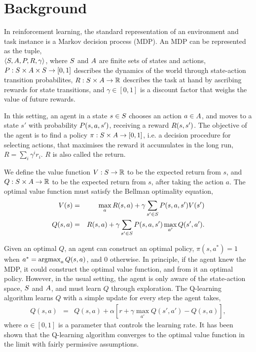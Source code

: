 \section{Background}
\label{sec:background}

In reinforcement learning, the standard representation of an environment
and task instance is a Markov decision process (MDP). An MDP can be
represented as the tuple, \\ $\langle  S, A, P,
R, \gamma  \rangle$, where $S$ and $A$ are finite sets of
states and actions, $P: S \times A \times
S \to [0,1]$ describes the dynamics of the world through
state-action transition probabilites, $R: S \times A
\to \mathbb{R}$ describes the task at hand by ascribing rewards for state
transitions, and $\gamma \in [0,1]$ is a discount factor that weighs the
value of future rewards.

In this setting, an agent in a state $s \in S$ chooses an action
$a \in A$, and moves to a state $s'$ with probability
$P(s,a,s')$, receiving a reward $R(s,s')$. The
objective of the agent is to find a policy $\pi: S \times A
\to [0,1]$, i.e. a decision procedure for selecting actions, that
maximises the reward it accumulates in the long run, $R = \sum_{i}
\gamma^i r_i$. $R$ is also called the return.

We define the value function $V: S \to \mathbb{R}$ to be the expected
return from $s$, and $Q: S \times A \to \mathbb{R}$ to be the
expected return from $s$, after taking the action $a$. The optimal value
function must satisfy the Bellman optimality equation, 
\begin{eqnarray*}
  V(s) &=& \max_{a} R(s,a) + \gamma \sum_{s' \in S} P(s,a,s') V(s') \\
  Q(s,a) &=& R(s,a) + \gamma \sum_{s' \in S} P(s,a,s') \max_{a'} Q(s',a').
\end{eqnarray*}

Given an optimal $Q$, an agent can construct an optimal policy,
$\pi(s,a^*) = 1$ when $a^* = \operatorname{argmax}_{a} Q(s,a)$, and $0$ otherwise. In
principle, if the agent knew the MDP, it could construct the optimal
value function, and from it an optimal policy.  However, in the usual
setting, the agent is only aware of the state-action space, $S$
and $A$, and must learn $Q$ through exploration. The Q-learning
algorithm learns $Q$ with a simple update for every step the agent
takes, 
\begin{eqnarray*}
    Q(s,a) &=& Q(s,a) + \alpha [ r + \gamma \max_{a'} Q(s',a') - Q(s,a) ],
\end{eqnarray*}
\noindent
where $\alpha \in [0,1]$ is a parameter that controls the learning rate.
It has been shown that the Q-learning algorithm converges to the optimal
value function in the limit with fairly permissive assumptions.

